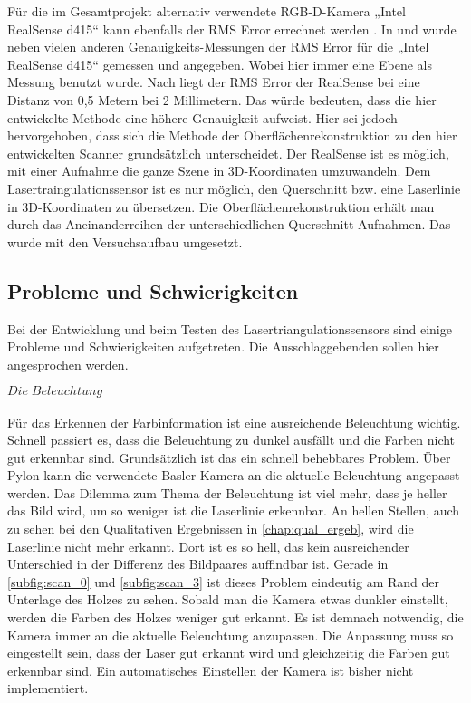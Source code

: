 		Für die im Gesamtprojekt alternativ verwendete RGB-D-Kamera „Intel RealSense d415“ kann ebenfalls der RMS Error errechnet werden \citep[vgl.][]{noauthor_camera_nodate-1}. In \citep[vgl.][]{grunnet-jepsen_best-known-methods_nodate} und \citep[vgl.][]{lourenco_intel_2021} wurde neben vielen anderen Genauigkeits-Messungen der RMS Error für die „Intel RealSense d415“ gemessen und angegeben. Wobei hier immer eine Ebene als Messung benutzt wurde. Nach \citep[vgl.][]{lourenco_intel_2021} liegt der RMS Error der RealSense bei eine Distanz von 0,5 Metern bei 2 Millimetern. Das würde bedeuten, dass die hier entwickelte Methode eine höhere Genauigkeit aufweist. Hier sei jedoch hervorgehoben, dass sich die Methode der Oberflächenrekonstruktion zu den hier entwickelten Scanner grundsätzlich unterscheidet. Der RealSense ist es möglich, mit einer Aufnahme die ganze Szene in 3D-Koordinaten umzuwandeln. Dem Lasertraingulationssensor ist es nur möglich, den Querschnitt bzw. eine Laserlinie in 3D-Koordinaten zu übersetzen. Die Oberflächenrekonstruktion erhält man durch das Aneinanderreihen der unterschiedlichen Querschnitt-Aufnahmen. Das wurde mit den Versuchsaufbau umgesetzt.
		
		\subsection{Probleme und Schwierigkeiten}\label{chap:probleme_schwierigkeiten}
		Bei der Entwicklung und beim Testen des Lasertriangulationssensors sind einige Probleme und Schwierigkeiten aufgetreten. Die Ausschlaggebenden sollen hier angesprochen werden.
		
		$\underline{Die \; Beleuchtung}$
		
		Für das Erkennen der Farbinformation ist eine ausreichende Beleuchtung wichtig. Schnell passiert es, dass die Beleuchtung zu dunkel ausfällt und die Farben nicht gut erkennbar sind. Grundsätzlich ist das ein schnell behebbares Problem. Über Pylon kann die verwendete Basler-Kamera an die aktuelle Beleuchtung angepasst werden. Das Dilemma zum Thema der Beleuchtung ist viel mehr, dass je heller das Bild wird, um so weniger ist die Laserlinie erkennbar. An hellen Stellen, auch zu sehen bei den Qualitativen Ergebnissen in \ref{chap:qual_ergeb}, wird die Laserlinie nicht mehr erkannt. Dort ist es so hell, das kein ausreichender Unterschied in der Differenz des Bildpaares auffindbar ist. Gerade in \ref{subfig:scan_0} und \ref{subfig:scan_3} ist dieses Problem eindeutig am Rand der Unterlage des Holzes zu sehen. Sobald man die Kamera etwas dunkler einstellt, werden die Farben des Holzes weniger gut erkannt. Es ist demnach notwendig, die Kamera immer an die aktuelle Beleuchtung anzupassen. Die Anpassung muss so eingestellt sein, dass der Laser gut erkannt wird und gleichzeitig die Farben gut erkennbar sind. Ein automatisches Einstellen der Kamera ist bisher nicht implementiert.
		
